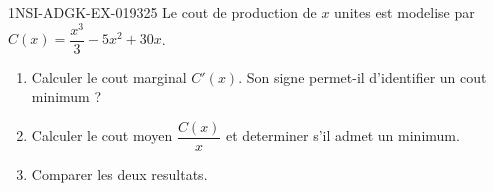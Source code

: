 \begin{exercice}{1NSI-ADGK-EX-019}{3}{25}
Le cout de production de $x$ unites est modelise par $C(x) = \dfrac{x^3}{3} - 5x^2 + 30x$.
\begin{enumerate}
  \item Calculer le cout marginal $C'(x)$. Son signe permet-il d'identifier un cout minimum ?
  \item Calculer le cout moyen $\dfrac{C(x)}{x}$ et determiner s'il admet un minimum.
  \item Comparer les deux resultats.
\end{enumerate}

\end{exercice}
